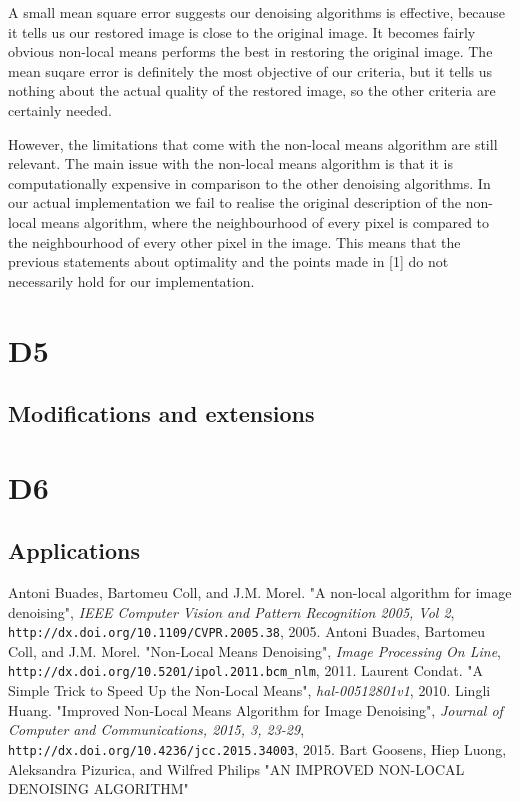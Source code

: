 \documentclass[fullpage]{article}
\begin{document}
A small mean square error suggests our denoising algorithms is effective, because it tells us our restored image is close to the original image. It becomes fairly obvious non-local means performs the best in restoring the original image. The mean suqare error is definitely the most objective of our criteria, but it tells us nothing about the actual quality of the restored image, so the other criteria are certainly needed.

However, the limitations that come with the non-local means algorithm are still relevant. The main issue with the non-local means algorithm is that it is computationally expensive in comparison to the other denoising algorithms. In our actual implementation we fail to realise the original description of the non-local means algorithm, where the neighbourhood of every pixel is compared to the neighbourhood of every other pixel in the image. This means that the previous statements about optimality and the points made in [1] do not necessarily hold for our implementation.
\section{D5}
\subsection{Modifications and extensions}
\section{D6}
\subsection{Applications}
\begin{thebibliography}{9}
Antoni Buades, Bartomeu Coll, and J.M. Morel.
"A non-local algorithm for image denoising",
\textit{IEEE Computer Vision and Pattern Recognition 2005, Vol 2}, \texttt{http://dx.doi.org/10.1109/CVPR.2005.38}, 2005.
Antoni Buades, Bartomeu Coll, and J.M. Morel.
"Non-Local Means Denoising",
\textit{Image Processing On Line}, \texttt{http://dx.doi.org/10.5201/ipol.2011.bcm\_nlm}, 2011.
Laurent Condat. 
"A Simple Trick to Speed Up the Non-Local Means",
\textit{hal-00512801v1}, 2010.
Lingli Huang.
"Improved Non-Local Means Algorithm for Image Denoising",
\textit{Journal of Computer and Communications, 2015, 3, 23-29}, \texttt{http://dx.doi.org/10.4236/jcc.2015.34003}, 2015.
Bart Goosens, Hiep Luong, Aleksandra Pizurica, and Wilfred Philips
"AN IMPROVED NON-LOCAL DENOISING ALGORITHM"
\end{thebibliography}
\end{document}
